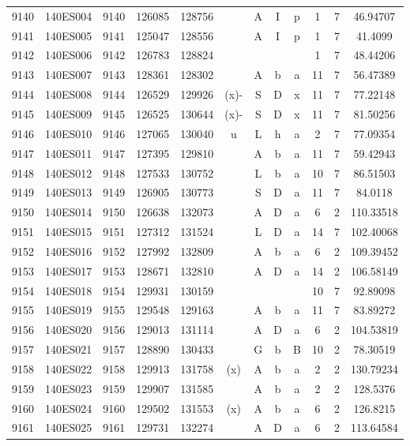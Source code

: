\begin{tabular}{|*{12}{c|}}
9140 & 140ES004 & 9140 & 126085 & 128756 &  & A & I & p & 1 & 7 & 46.94707 \\ 
9141 & 140ES005 & 9141 & 125047 & 128556 &  & A & I & p & 1 & 7 & 41.4099 \\ 
9142 & 140ES006 & 9142 & 126783 & 128824 &  &  &  &  & 1 & 7 & 48.44206 \\ 
9143 & 140ES007 & 9143 & 128361 & 128302 &  & A & b & a & 11 & 7 & 56.47389 \\ 
9144 & 140ES008 & 9144 & 126529 & 129926 & (x)- & S & D & x & 11 & 7 & 77.22148 \\ 
9145 & 140ES009 & 9145 & 126525 & 130644 & (x)- & S & D & x & 11 & 7 & 81.50256 \\ 
9146 & 140ES010 & 9146 & 127065 & 130040 & u & L & h & a & 2 & 7 & 77.09354 \\ 
9147 & 140ES011 & 9147 & 127395 & 129810 &  & A & b & a & 11 & 7 & 59.42943 \\ 
9148 & 140ES012 & 9148 & 127533 & 130752 &  & L & b & a & 10 & 7 & 86.51503 \\ 
9149 & 140ES013 & 9149 & 126905 & 130773 &  & S & D & a & 11 & 7 & 84.0118 \\ 
9150 & 140ES014 & 9150 & 126638 & 132073 &  & A & D & a & 6 & 2 & 110.33518 \\ 
9151 & 140ES015 & 9151 & 127312 & 131524 &  & L & D & a & 14 & 7 & 102.40068 \\ 
9152 & 140ES016 & 9152 & 127992 & 132809 &  & A & b & a & 6 & 2 & 109.39452 \\ 
9153 & 140ES017 & 9153 & 128671 & 132810 &  & A & D & a & 14 & 2 & 106.58149 \\ 
9154 & 140ES018 & 9154 & 129931 & 130159 &  &  &  &  & 10 & 7 & 92.89098 \\ 
9155 & 140ES019 & 9155 & 129548 & 129163 &  & A & b & a & 11 & 7 & 83.89272 \\ 
9156 & 140ES020 & 9156 & 129013 & 131114 &  & A & D & a & 6 & 2 & 104.53819 \\ 
9157 & 140ES021 & 9157 & 128890 & 130433 &  & G & b & B & 10 & 2 & 78.30519 \\ 
9158 & 140ES022 & 9158 & 129913 & 131758 & (x) & A & b & a & 2 & 2 & 130.79234 \\ 
9159 & 140ES023 & 9159 & 129907 & 131585 &  & A & b & a & 2 & 2 & 128.5376 \\ 
9160 & 140ES024 & 9160 & 129502 & 131553 & (x) & A & b & a & 6 & 2 & 126.8215 \\ 
9161 & 140ES025 & 9161 & 129731 & 132274 &  & A & D & a & 6 & 2 & 113.64584 \\ 

\end{tabular}
